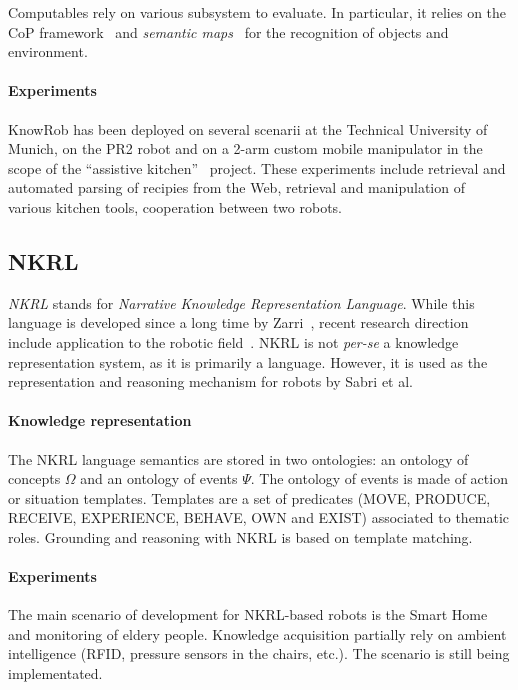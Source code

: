\documentclass{IEEEtran}
\begin{document}
Computables rely on various subsystem to evaluate. In particular, it relies on
the CoP framework~\cite{Klank2009} and \emph{semantic maps}~\cite{Blodow2011}
for the recognition of objects and environment.


\paragraph{Experiments} {\sc KnowRob} has been deployed on several scenarii at
the Technical University of Munich, on the PR2 robot and on a 2-arm custom
mobile manipulator in the scope of the ``assistive kitchen''~\cite{Beetz2008}
project. These experiments include retrieval and automated parsing of recipies
from the Web, retrieval and manipulation of various kitchen tools, cooperation
between two robots.

\subsection{NKRL}
\label{sect|nkrl}

\emph{NKRL} stands for \emph{Narrative Knowledge Representation Language}.
While this language is developed since a long time by Zarri~\cite{Zarri1997,
Zarri2008}, recent research direction include application to the robotic
field~\cite{Sabri2011}. NKRL is not {\it per-se} a knowledge representation
system, as it is primarily a language. However, it is used as the
representation and reasoning mechanism for robots by Sabri et al.

\paragraph{Knowledge representation} The NKRL language semantics are stored in
two ontologies: an ontology of concepts $\Omega$ and an ontology of events
$\Psi$. The ontology of events is made of action or situation templates.
Templates are a set of predicates (MOVE, PRODUCE, RECEIVE, EXPERIENCE, BEHAVE,
OWN and EXIST) associated to thematic roles. Grounding and reasoning with NKRL
is based on template matching.

\paragraph{Experiments} The main scenario of development for NKRL-based robots
is the Smart Home and monitoring of eldery people. Knowledge acquisition
partially rely on ambient intelligence (RFID, pressure sensors in the chairs,
etc.). The scenario is still being implementated.
\end{document}
